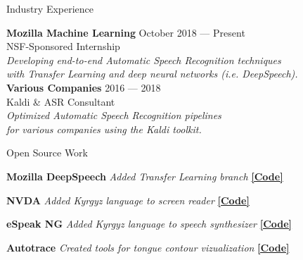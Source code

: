 \documentclass{resume} %
\begin{document}
\begin{rSection}{Industry Experience}
  
{\bf Mozilla Machine Learning} \hfill {October 2018 --- Present} \\ 
NSF-Sponsored Internship \hfill {} \\
\textit{Developing end-to-end Automatic Speech Recognition techniques} \hfill {} \\
\textit{with Transfer Learning and deep neural networks (i.e. DeepSpeech).} \hfill {} \\
  
{\bf Various Companies} \hfill {2016 --- 2018} \\ 
Kaldi \& ASR Consultant  \hfill {} \\
\textit{Optimized Automatic Speech Recognition pipelines}   \hfill {} \\
\textit{for various companies using the Kaldi toolkit.}   \hfill {} \\
\end{rSection}



\begin{rSection}{Open Source Work}

  {\textbf{Mozilla DeepSpeech}} {\hfill \textit{Added Transfer Learning branch} {\hspace{2.5cm} \href{https://github.com/mozilla/DeepSpeech/tree/transfer-learning}{\textbf{[Code]}}}} \\
\vspace{-.35cm}

{\textbf{NVDA}} {\hfill \textit{Added Kyrgyz language to screen reader} {\hspace{2.5cm} \href{https://github.com/JRMeyer/nvda}{\textbf{[Code]}}}} \\
\vspace{-.35cm}

{\textbf{eSpeak NG}} {\hfill \textit{Added Kyrgyz language to speech synthesizer} {\hspace{2.5cm} \href{https://github.com/rhdunn/espeak/commits?author=JRMeyer}{\textbf{[Code]}}}}\\
\vspace{-.35cm}

{\textbf{Autotrace}} {\hfill \textit{Created tools for tongue contour vizualization} {\hspace{2.5cm} \href{https://github.com/JRMeyer/Autotrace}{\textbf{[Code]}}}} \\

\end{rSection}
\end{document}
